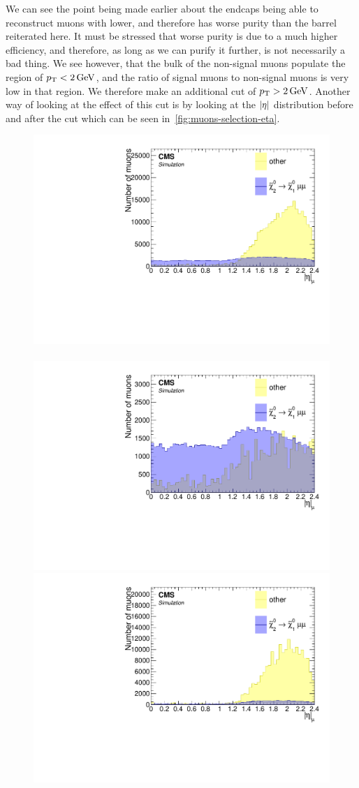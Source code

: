 We can see the point being made earlier about the endcaps being able to reconstruct muons with lower\pt, and therefore has worse purity than the barrel reiterated here. It must be stressed that worse purity is due to a much higher efficiency, and therefore, as long as we can purify it further, is not necessarily a bad thing. We see however, that the bulk of the non-signal muons populate the region of $p_{\mathrm{T}}<2\,\text{Ge\hspace{-.08em}V}$, and the ratio of signal muons to non-signal muons is very low in that region. We therefore make an additional cut of $p_{\mathrm{T}}>2\,\text{Ge\hspace{-.08em}V}$. Another way of looking at the effect of this cut is by looking at the $\lvert \eta \rvert$ distribution before and after the \pt cut which can be seen in~\ref{fig:muons-selection-eta}.

\begin{figure}[!htb]
\centering
\includegraphics[width=0.48\linewidth]{plots/lepton_selection/lepton_selection_dm5p63/none_Muons_Eta.pdf} \,
\includegraphics[width=0.48\linewidth]{plots/lepton_selection/lepton_selection_dm5p63/none_Muons_Eta_after_pt.pdf} \\
\includegraphics[width=0.48\linewidth]{plots/lepton_selection/lepton_selection_dm1p92/none_Muons_Eta.pdf}  \,

\end{figure}
